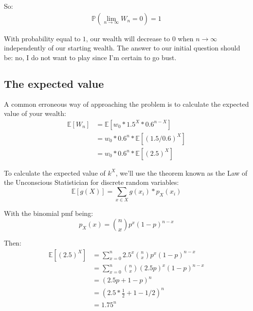 \documentclass[12pt]{article}
\begin{document}
So:
\begin{align*}
\begin{equation*}
  \mathbb{P}(\lim_{n\to\infty} W_n = 0) = 1
\end{equation*}
\end{align*}
  
With probability equal to $1$, our wealth will decrease to 0 when $n\to\infty$ independently of our starting wealth. The answer to our initial question should be: no, I do not want to play since I'm certain to go bust.

\subsection{The expected value}
A common erroneous way of approaching the problem is to calculate the expected value of your wealth:
\begin{equation*}
  \begin{split}
    \mathbb{E}[W_n] &= \mathbb{E}[w_0 * 1.5^X * 0.6^{n-X}]\\
    & = w_0 * 0.6^n * \mathbb{E}[(1.5/0.6)^X]\\
    & = w_0 * 0.6^n * \mathbb{E}[(2.5)^X]
  \end{split}
\end{equation*}

To calculate the expected value of $k^X$, we'll use the theorem known as the Law of the Unconscious Statistician for discrete random variables:
\begin{equation}
    \mathbb{E}[g(X)] = \sum\limits_{x \in X} g(x_i)*p_X(x_i)
\end{equation}

With the binomial pmf being:
\begin{equation}
    p_X(x) = {n \choose x} p^x (1-p)^{n-x}
\end{equation}

Then:
\begin{equation*}
  \begin{split}
    \mathbb{E}[(2.5)^X] &= \sum\limits_{x=0}^{n} 2.5^x {n \choose x} p^x (1-p)^{n-x}\\
    &= \sum\limits_{x=0}^{n} {n \choose x} (2.5p)^x (1-p)^{n-x}\\
    &= (2.5p + 1 - p)^n\\
    &= (2.5 * \frac{1}{2} + 1 - 1/2)^n\\
    & = 1.75^n
  \end{split}
\end{equation*}
\end{document}
